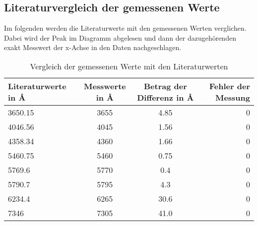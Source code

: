 \subsection{Literaturvergleich der gemessenen Werte} \label{Messlit}

Im folgenden werden die Literaturwerte \cite[S. 1474]{CRCHandbook2003} mit den gemessenen Werten verglichen. Dabei wird der Peak im Diagramm abgelesen und dann der dazugehörenden 
exakt Messwert der x-Achse in den Daten nachgeschlagen.

\begin{table}[h]
    \centering
    \begin{tabular}[h]{l|c|c|r}


        Literaturwerte in \r{A} & Messwerte in \r{A} & Betrag der Differenz in \r{A} & Fehler der Messung\\
       \hline
       3650.15  & 3655 & 4.85 & 0\\
       4046.56  & 4045 & 1.56 & 0\\
       4358.34 & 4360 & 1.66  & 0\\
       5460.75 & 5460 & 0.75 & 0\\
       5769.6  & 5770 & 0.4 & 0\\
       5790.7  & 5795 & 4.3 & 0\\
       6234.4  & 6265 & 30.6 & 0\\
       7346  & 7305 & 41.0 & 0\\
\end{tabular}
    \caption{Vergleich der gemessenen Werte mit den Literaturwerten}
\end{table}